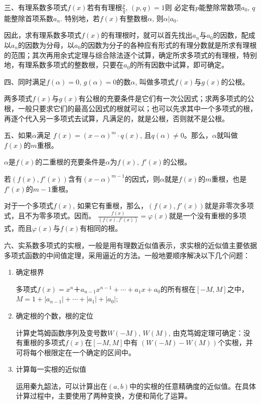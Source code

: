 三、有理系数多项式$f(x)$若有有理根$\frac{p}{q}$, $(p,q)=1$则
必定有$p$能整除常数项$a_0$, $q$能整除首项系数$a_n$. 特别地，若$f(x)$有整数根$\alpha$, 则$\alpha|a_0$. 

因此，求有理系数多项式$f(x)$的有理根时，就可以首先找出$a_n$与$a_0$的因数，配成以$a_n$的因数为分母，以$a_0$的因数为分子的各种应有形式的有理分数就是所求有理根的范围；其次再用余式定理与综合除法逐个试算，确定所求多项式的有理根，特别地，有理系数多项式的整数根，只要在$a_0$的所有因数中试算，即可确定。

四、同时满足$f(\alpha)=0$, $g(\alpha)=0$的数$\alpha$, 叫做多项式$f(x)$与$g(x)$的公根。

两多项式$f(x)$与$g(x)$有公根的充要条件是它们有一次公因式；求两多项式的公根，一般只要求它们的最高公因式的根就可以；也可以先求其中一个多项式的根，再逐个代入另一多项式去试算，凡满足的，就是公根，否则就不是公根。

五、如果$\alpha$满足
$f(x)=(x-\alpha)^m\cdot q(x)$, 且$q(\alpha)\ne 0$。那么，$\alpha$就叫做$f(x)$的$m$重根。

$\alpha$是$f(x)$的二重根的充要条件是$\alpha$为$f(x)$, $f'(x)$的公根。

若$(f(x),f'(x))$含有$(x-\alpha)^{m-1}$的因式，则$\alpha$就是$f(x)$的$m$重根，也是$f'(x)$的$m-1$重根。

对于一个多项式$f(x)$, 如果它有重根，那么，$(f(x),f'(x))$就是非零次多项式，且不为零多项式。因而。
$\frac{f (x)}{(f (x) ,f' (x) )}=\varphi(x)$就是一个没有重根的多项式，而且$\varphi(x)$与$f(x)$有相同的根。

六、实系数多项式的实根，一般是用有理数近似值表示，求实根的近似值主要依据多项式函数的中间值定理，采用逼近的方法。一般地要顺序解决以下几个问题：
\begin{enumerate}
    \item 确定根界
    
    多项式$f(x)=x^n＋a_{n-1}x^{n-1}+\cdots+a_1x+a_0$的所有根在$[-M,M]$之中，$M=1+|a_{n-1}|+\cdots+|a_1|+|a_0|$;
    
    \item 确定根的个数，根的定位
    
    计算史笃姆函数序列及变号数$W(-M)$, $W(M)$, 由克笃姆定理可确定：没有重根的多项式$f(x)$在$[-M,M]$中有
    $(W(-M)-W(M))$个实根，并可将每个根限定在一个确定的区间中。
    \item 计算每一实根的近似值
    
    运用秦九韶法，可以计算出在$(a,b)$中的实根的任意精确度的近似值。在具体计算过程中，主要使用了两种变换，方便和简化了运算。
 \end{enumerate}

